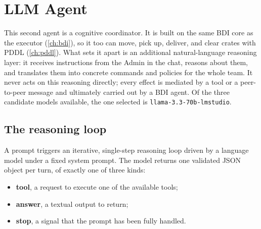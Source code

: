 \chapter{LLM Agent}
\label{ch:llm}
This second agent is a cognitive coordinator. It is built on the same BDI core as the
executor (\cref{ch:bdi}), so it too can move, pick up, deliver, and clear crates
with PDDL (\cref{ch:pddl}). What sets it apart is an additional natural-language
reasoning layer: it receives instructions from the Admin in the chat, reasons about
them, and translates them into concrete commands and policies for the whole team. It
never acts on this reasoning directly; every effect is mediated by a tool or a
peer-to-peer message and ultimately carried out by a BDI agent. Of the three candidate
models available, the one selected is \texttt{llama-3.3-70b-lmstudio}.

\begin{center}
\end{center}

\section{The reasoning loop}
\label{sec:reasoninig-loop}
A prompt triggers an iterative, single-step reasoning loop driven by a language
model under a fixed system prompt. The model returns one validated JSON
object per turn, of exactly one of three kinds:

\begin{itemize}
  \item \textbf{tool}, a request to execute one of the available tools;
  \item \textbf{answer}, a textual output to return;
  \item \textbf{stop}, a signal that the prompt has been fully handled.
\end{itemize}

